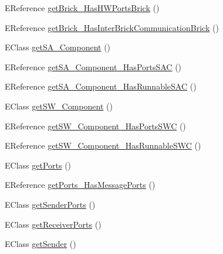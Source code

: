 \begin{DoxyCompactItemize}
E\-Reference \hyperlink{interfaceshootingmachineemfmodel_1_1_shootingmachineemfmodel_package_add497ce1586024db504c3cc1367ecb9e}{get\-Brick\-\_\-\-Has\-H\-W\-Ports\-Brick} ()
\item 
E\-Reference \hyperlink{interfaceshootingmachineemfmodel_1_1_shootingmachineemfmodel_package_a777819b01697812835145fb6ace33434}{get\-Brick\-\_\-\-Has\-Inter\-Brick\-Communication\-Brick} ()
\item 
E\-Class \hyperlink{interfaceshootingmachineemfmodel_1_1_shootingmachineemfmodel_package_ac49fa1dede8bb81104b9803e26716f31}{get\-S\-A\-\_\-\-Component} ()
\item 
E\-Reference \hyperlink{interfaceshootingmachineemfmodel_1_1_shootingmachineemfmodel_package_aeec6cb579a571013f72f8caeecc1d8aa}{get\-S\-A\-\_\-\-Component\-\_\-\-Has\-Ports\-S\-A\-C} ()
\item 
E\-Reference \hyperlink{interfaceshootingmachineemfmodel_1_1_shootingmachineemfmodel_package_a784dfbee59493d06fca06b622ca5b631}{get\-S\-A\-\_\-\-Component\-\_\-\-Has\-Runnable\-S\-A\-C} ()
\item 
E\-Class \hyperlink{interfaceshootingmachineemfmodel_1_1_shootingmachineemfmodel_package_a888d6241e762ea9199688bbb5c06c947}{get\-S\-W\-\_\-\-Component} ()
\item 
E\-Reference \hyperlink{interfaceshootingmachineemfmodel_1_1_shootingmachineemfmodel_package_aec230ddc6e7f5c944ae6e9dc80dd168f}{get\-S\-W\-\_\-\-Component\-\_\-\-Has\-Ports\-S\-W\-C} ()
\item 
E\-Reference \hyperlink{interfaceshootingmachineemfmodel_1_1_shootingmachineemfmodel_package_a4fff6511a08068cb22f2e2d0c962e495}{get\-S\-W\-\_\-\-Component\-\_\-\-Has\-Runnable\-S\-W\-C} ()
\item 
E\-Class \hyperlink{interfaceshootingmachineemfmodel_1_1_shootingmachineemfmodel_package_a3d8e2a50ea904de327878d59e06a49eb}{get\-Ports} ()
\item 
E\-Reference \hyperlink{interfaceshootingmachineemfmodel_1_1_shootingmachineemfmodel_package_a85d9d890687eca85ad161466ba0663af}{get\-Ports\-\_\-\-Has\-Message\-Ports} ()
\item 
E\-Class \hyperlink{interfaceshootingmachineemfmodel_1_1_shootingmachineemfmodel_package_a20b08c481a2cca0182c4bd0f15ab1475}{get\-Sender\-Ports} ()
\item 
E\-Class \hyperlink{interfaceshootingmachineemfmodel_1_1_shootingmachineemfmodel_package_a3814072abeef98ef4b6024cb7797ddec}{get\-Receiver\-Ports} ()
\item 
E\-Class \hyperlink{interfaceshootingmachineemfmodel_1_1_shootingmachineemfmodel_package_a2a69949be5640c789c4f18ac4113f876}{get\-Sender} ()

\end{DoxyCompactItemize}
